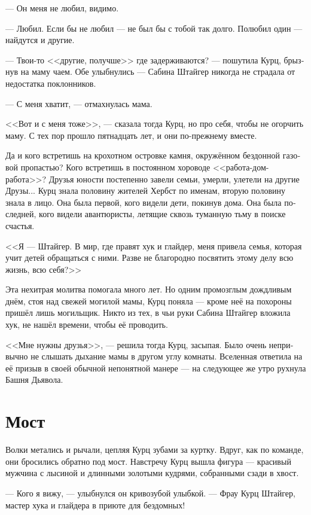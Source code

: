 \documentclass[a4paper,12pt,fleqn]{book}\usepackage{cooltooltips}\usepackage{polyglossia}\setdefaultlanguage[babelshorthands=true]{russian}\setotherlanguage{english}\defaultfontfeatures{Ligatures=TeX,Mapping=tex-text} \usepackage{xcolor}\definecolor{lightgray}{HTML}{bbbbbb}\color{lightgray}\newcommand{\ml}[3]{\textenglish{\textcolor{black}{#3}}}
\begin{document}
--- Он меня не любил, видимо.

--- Любил.
Если бы не любил --- не был бы с тобой так долго.
Полюбил один --- найдутся и другие.

--- Твои-то <<другие, получше>> где задерживаются? --- пошутила Курц, брызнув на маму чаем.
Обе улыбнулись --- Сабина Штайгер никогда не страдала от недостатка поклонников.

--- С меня хватит, --- отмахнулась мама.

<<Вот и с меня тоже>>, --- сказала тогда Курц, но про себя, чтобы не огорчить маму.
С тех пор прошло пятнадцать лет, и они по-прежнему вместе.

Да и кого встретишь на крохотном островке камня, окружённом бездонной газовой пропастью?
Кого встретишь в постоянном хороводе <<работа-дом-работа>>?
Друзья юности постепенно завели семьи, умерли, улетели на другие Друзы...
Курц знала половину жителей Хербст по именам, вторую половину знала в лицо.
Она была первой, кого видели дети, покинув дома.
Она была последней, кого видели авантюристы, летящие сквозь туманную тьму в поиске счастья.

<<Я --- Штайгер.
В мир, где правят хук и глайдер, меня привела семья, которая учит детей обращаться с ними.
Разве не благородно посвятить этому делу всю жизнь, всю себя?>>

Эта нехитрая молитва помогала много лет.
Но одним промозглым дождливым днём, стоя над свежей могилой мамы, Курц поняла --- кроме неё на похороны пришёл лишь могильщик.
Никто из тех, в чьи руки Сабина Штайгер вложила хук, не нашёл времени, чтобы её проводить.

<<Мне нужны друзья>>, --- решила тогда Курц, засыпая.
Было очень непривычно не слышать дыхание мамы в другом углу комнаты.
Вселенная ответила на её призыв в своей обычной непонятной манере --- на следующее же утро рухнула Башня Дьявола.

\section{Мост}

Волки метались и рычали, цепляя Курц зубами за куртку.
Вдруг, как по команде, они бросились обратно под мост.
Навстречу Курц вышла фигура --- красивый мужчина с лысиной и длинными золотыми кудрями, собранными сзади в хвост.

--- Кого я вижу, --- улыбнулся он кривозубой улыбкой.
--- Фрау Курц Штайгер, мастер хука и глайдера в приюте для бездомных!
\end{document}
